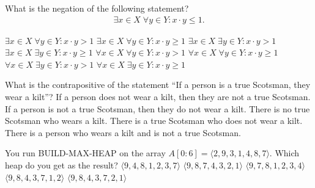 \pageshift

What is the negation of the following statement?
\begin{align*}
  \exists x \in X \; \forall y \in Y : x \cdot y \le 1.
\end{align*}
\oneanswer

\optionsstart
\answer \(\exists x \in X \; \forall y \in Y : x \cdot y > 1\)
\answer \(\exists x \in X \; \forall y \in Y : x \cdot y \geq 1\)
\answer \(\exists x \in X \; \exists y \in Y : x \cdot y > 1\)
\answer \(\exists x \in X \; \exists y \in Y : x \cdot y \geq 1\)
\answer \(\forall x \in X \; \forall y \in Y : x \cdot y > 1\)
\answer \(\forall x \in X \; \forall y \in Y : x \cdot y \geq 1\)
\answer \(\forall x \in X \; \exists y \in Y : x \cdot y > 1\) \correct
{}
\answer \(\forall x \in X \; \exists y \in Y : x \cdot y \geq 1\)
\optionsend
{}

What is the contrapositive of the statement
``If a person is a true Scotsman, they wear a kilt''?
\oneanswer
\optionsstart
\answer If a person does not wear a kilt, then they are not a true Scotsman. \correct
\answer If a person is not a true Scotsman, then they do not wear a kilt.
\answer There is no true Scotsman who wears a kilt.
\answer There is a true Scotsman who does not wear a kilt.
\answer There is a person who wears a kilt and is not a true Scotsman.
\optionsend
{}

You run BUILD-MAX-HEAP on the array \(A[0: 6] = \langle 2, 9, 3, 1, 4, 8, 7 \rangle\).
Which heap do you get as the result?
\oneanswer
\optionsstart
\answer \(\langle 9, 4, 8, 1, 2, 3, 7 \rangle\) \correct
\answer \(\langle 9, 8, 7, 4, 3, 2, 1 \rangle\)
\answer \(\langle 9, 7, 8, 1, 2, 3, 4 \rangle\)
\answer \(\langle 9, 8, 4, 3, 7, 1, 2 \rangle\)
\answer \(\langle 9, 8, 4, 3, 7, 2, 1 \rangle\)
\optionsend
{}


